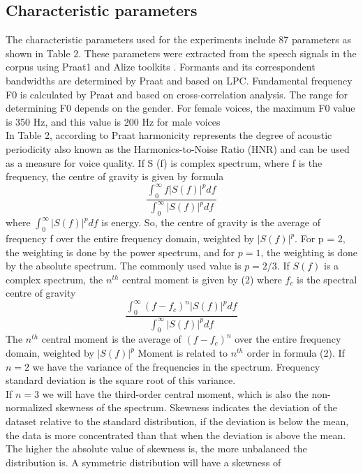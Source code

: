\documentclass[a4paper,12pt]{article}
\begin{document}
\subsection{Characteristic parameters}
The characteristic parameters used for the experiments include 87 parameters as shown
in Table 2. These parameters were extracted from the speech signals in the corpus using
Praat1 and Alize toolkits \cite{9}. Formants and its correspondent bandwidths are determined
by Praat and based on LPC. Fundamental frequency F0 is calculated by Praat and based on
cross-correlation analysis. The range for determining F0 depends on the gender. For female
voices, the maximum F0 value is 350 Hz, and this value is 200 Hz for male voices
\\
In Table 2, according to Praat harmonicity represents the degree of acoustic periodicity
also known as the Harmonics-to-Noise Ratio (HNR) and can be used as a measure for voice
quality. If S (f) is complex spectrum, where f is the frequency, the centre of gravity is given
by formula
\begin{equation}
\frac{\int_0^{\infty} f|S(f)|^p d f}{\int_0^{\infty}|S(f)|^p d f}
\end{equation}
where $\int_0^{\infty}|S(f)|^p d f$ is energy. So, the centre of gravity is the average of frequency f over the entire frequency domain, weighted by $|S(f)|^p$. For p = 2, the weighting is done by the power
spectrum, and for $p = 1$, the weighting is done by the absolute spectrum. The commonly
used value is $p = 2/3$. If $S (f)$ is a complex spectrum, the $n^{th}$
central moment is given by (2)
where $f_c$ is the spectral centre of gravity
\begin{equation}
\frac{\int_0^{\infty}\left(f-f_c\right)^n|S(f)|^p d f}{\int_0^{\infty}|S(f)|^p d f}
\end{equation}
The $n^{th}$ central moment is the average of $(f-f_c)^n$ over the entire frequency domain,
weighted by $|S(f)|^p$ Moment is related to $n^{th}$ order in formula (2). If $n = 2$ we have the
variance of the frequencies in the spectrum. Frequency standard deviation is the square root
of this variance.
\\
If $n = 3$ we will have the third-order central moment, which is also the non-normalized
skewness of the spectrum. Skewness indicates the deviation of the dataset relative to the
standard distribution, if the deviation is below the mean, the data is more concentrated than
that when the deviation is above the mean. The higher the absolute value of skewness is,
the more unbalanced the distribution is. A symmetric distribution will have a skewness of
\end{document}
